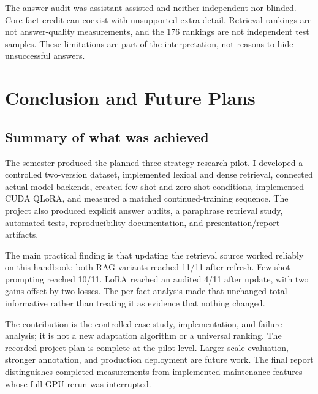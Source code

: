 \documentclass[11pt,letterpaper,oneside]{report}
\begin{document}
The answer audit was assistant-assisted and neither independent nor blinded. Core-fact credit can coexist with unsupported extra detail. Retrieval rankings are not answer-quality measurements, and the 176 rankings are not independent test samples. These limitations are part of the interpretation, not reasons to hide unsuccessful answers.

\chapter{Conclusion and Future Plans}
\section{Summary of what was achieved}
The semester produced the planned three-strategy research pilot. I developed a controlled two-version dataset, implemented lexical and dense retrieval, connected actual model backends, created few-shot and zero-shot conditions, implemented CUDA QLoRA, and measured a matched continued-training sequence. The project also produced explicit answer audits, a paraphrase retrieval study, automated tests, reproducibility documentation, and presentation/report artifacts.

The main practical finding is that updating the retrieval source worked reliably on this handbook: both RAG variants reached 11/11 after refresh. Few-shot prompting reached 10/11. LoRA reached an audited 4/11 after update, with two gains offset by two losses. The per-fact analysis made that unchanged total informative rather than treating it as evidence that nothing changed.

The contribution is the controlled case study, implementation, and failure analysis; it is not a new adaptation algorithm or a universal ranking. The recorded project plan is complete at the pilot level. Larger-scale evaluation, stronger annotation, and production deployment are future work. The final report distinguishes completed measurements from implemented maintenance features whose full GPU rerun was interrupted.
\end{document}
